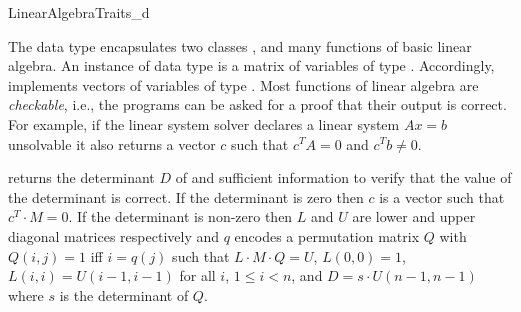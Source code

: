 \begin{ccRefConcept}{LinearAlgebraTraits_d}

\ccDefinition


The data type  encapsulates two classes
,  and many functions of basic linear algebra.
An instance of data type  is a matrix of variables of type
. Accordingly,  implements vectors of variables of
type .  Most functions of linear algebra are \emph{checkable},
i.e., the programs can be asked for a proof that their output is
correct. For example, if the linear system solver declares a linear
system $A x = b$ unsolvable it also returns a vector $c$ such that
$c^T A = 0$ and $c^T b \neq 0$.

\ccSetOneOfTwoColumns{5.5cm}
\ccTypes


\ccSetTwoOfThreeColumns{2cm}{1cm}

\ccOperations




 {returns the determinant $D$ of
   and sufficient information to verify that the value of the
  determinant is correct. If the determinant is zero then $c$ is a
  vector such that $c^T \cdot M = 0$. If the determinant is non-zero
  then $L$ and $U$ are lower and upper diagonal matrices respectively
  and $q$ encodes a permutation matrix $Q$ with $Q(i,j) = 1$ iff $i =
  q(j)$ such that $L \cdot M \cdot Q = U$, $L(0,0) = 1$, $L(i,i) = U(i
  - 1,i - 1)$ for all $i$, $1 \le i < n$, and $D = s \cdot U(n - 1,n -
  1)$ where $s$ is the determinant of $Q$. }


\end{ccRefConcept}
